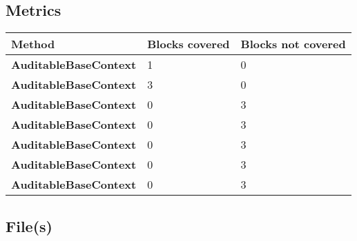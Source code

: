 \documentclass[a4paper,10pt]{article}
\begin{document}
\subsection{Metrics}
\begin{longtable}[l]{|l|l|l|}
\hline
\textbf{Method} & \textbf{Blocks covered} & \textbf{Blocks not covered}\\
\hline
\textbf{AuditableBaseContext} & 1 & 0\\
\hline
\textbf{AuditableBaseContext} & 3 & 0\\
\hline
\textbf{AuditableBaseContext} & 0 & 3\\
\hline
\textbf{AuditableBaseContext} & 0 & 3\\
\hline
\textbf{AuditableBaseContext} & 0 & 3\\
\hline
\textbf{AuditableBaseContext} & 0 & 3\\
\hline
\textbf{AuditableBaseContext} & 0 & 3\\
\hline
\end{longtable}
\subsection{File(s)}
\end{document}
